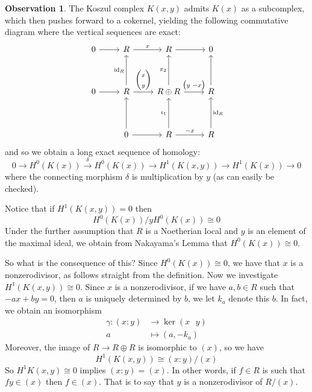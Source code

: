\documentclass[12pt]{article}
\theoremstyle{plain}
\theoremstyle{definition}
\newtheorem{observation}[thm]{Observation}
\newcommand{\lto}{\longrightarrow}
\begin{document}
	\begin{observation}\label{obs:koszul_reg}
		The Koszul complex $K(x,y)$ admits $K(x)$ as a subcomplex, which then pushes forward to a cokernel, yielding the following commutative diagram where the vertical sequences are exact:
		\begin{equation}\label{eq:sub_quotient}
			\begin{tikzcd}[row sep = huge]
				0\arrow[r] & R\arrow[r,"{x}"] & R\arrow[r] & 0\\
				0\arrow[r] & R\arrow[u,"{\operatorname{id}_R}"]\arrow[r,"{\begin{pmatrix}
						x\\
						y
					\end{pmatrix}
				}"] & R \oplus R\arrow[r,"{\begin{pmatrix}
						y \text{  } -x
					\end{pmatrix}
				}"]\arrow[u,"{\pi_2}"] & R\arrow[u]\\
				& 0\arrow[u]\arrow[r] & R\arrow[r,"{-x}"]\arrow[u,"{\iota_1}"] & R\arrow[u,swap,"{\operatorname{id}_R}"]
			\end{tikzcd}
		\end{equation}
		and so we obtain a long exact sequence of homology:
		\begin{equation}
			0\lto H^0(K(x)) \stackrel{\delta}{\lto} H^0(K(x)) \lto H^1(K(x,y)) \lto H^1(K(x))\lto 0
		\end{equation}
		where the connecting morphism $\delta$ is multiplication by $y$ (as can easily be checked).
		
		Notice that if $H^1(K(x,y))=0$ then
		\begin{equation}
			H^0(K(x))/yH^0(K(x)) \cong 0
		\end{equation}
		Under the further assumption that $R$ is a Noetherian local and $y$ is an element of the maximal ideal, we obtain from Nakayama's Lemma that $H^0(K(x)) \cong 0$.
		
		So what is the consequence of this? Since $H^0(K(x)) \cong 0$, we have that $x$ is a nonzerodivisor, as follows straight from the definition. Now we investigate $H^1(K(x,y)) \cong 0$. Since $x$ is a nonzerodivisor, if we have $a,b \in R$ such that $-ax + by = 0$, then $a$ is uniquely determined by $b$, we let $k_a$ denote this $b$. In fact, we obtain an isomorphism
		\begin{align*}
			\gamma: (x:y) &\lto \operatorname{ker}(x\text{ }y)\\
			a &\longmapsto (a,-k_a)
		\end{align*}
		Moreover, the image of $R \lto R \oplus R$ is isomorphic to $(x)$, so we have
		\begin{equation}
			H^1(K(x,y)) \cong (x:y)/(x)
		\end{equation}
		So $H^1K(x,y) \cong 0$ implies $(x:y) = (x)$. In other words, if $f \in R$ is such that $fy \in (x)$ then $f \in (x)$. That is to say that $y$ is a nonzerodivisor of $R/(x)$.
	\end{observation}
\end{document}
